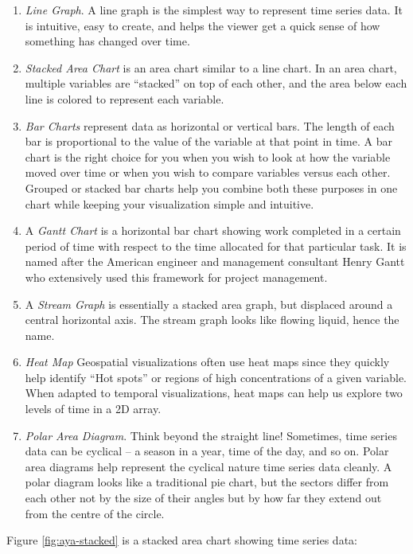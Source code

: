 \documentclass[]{book}
\providecommand{\tightlist}{%
  \setlength{\itemsep}{0pt}\setlength{\parskip}{0pt}}
\theoremstyle{definition}
\theoremstyle{definition}
\theoremstyle{definition}
\theoremstyle{remark}
\begin{document}
\begin{enumerate}
\def\labelenumi{\arabic{enumi}.}
\tightlist
\item
  \emph{Line Graph}. A line graph is the simplest way to represent time
  series data. It is intuitive, easy to create, and helps the viewer get
  a quick sense of how something has changed over time.
\item
  \emph{Stacked Area Chart} is an area chart similar to a line chart. In
  an area chart, multiple variables are ``stacked'' on top of each
  other, and the area below each line is colored to represent each
  variable.
\item
  \emph{Bar Charts} represent data as horizontal or vertical bars. The
  length of each bar is proportional to the value of the variable at
  that point in time. A bar chart is the right choice for you when you
  wish to look at how the variable moved over time or when you wish to
  compare variables versus each other. Grouped or stacked bar charts
  help you combine both these purposes in one chart while keeping your
  visualization simple and intuitive.
\item
  A \emph{Gantt Chart} is a horizontal bar chart showing work completed
  in a certain period of time with respect to the time allocated for
  that particular task. It is named after the American engineer and
  management consultant Henry Gantt who extensively used this framework
  for project management.
\item
  A \emph{Stream Graph} is essentially a stacked area graph, but
  displaced around a central horizontal axis. The stream graph looks
  like flowing liquid, hence the name.
\item
  \emph{Heat Map} Geospatial visualizations often use heat maps since
  they quickly help identify ``Hot spots'' or regions of high
  concentrations of a given variable. When adapted to temporal
  visualizations, heat maps can help us explore two levels of time in a
  2D array.
\item
  \emph{Polar Area Diagram}. Think beyond the straight line! Sometimes,
  time series data can be cyclical -- a season in a year, time of the
  day, and so on. Polar area diagrams help represent the cyclical nature
  time series data cleanly. A polar diagram looks like a traditional pie
  chart, but the sectors differ from each other not by the size of their
  angles but by how far they extend out from the centre of the circle.
\end{enumerate}

Figure \ref{fig:aya-stacked} is a stacked area chart showing time series
data:
\end{document}
